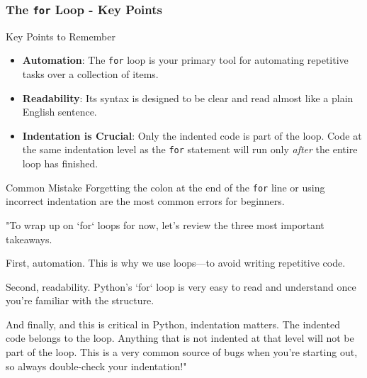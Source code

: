 \documentclass{beamer}
\begin{document}
\begin{frame}[fragile]
    \frametitle{The \texttt{for} Loop - Key Points}
    
    \begin{block}{Key Points to Remember}
        \begin{itemize}
            \item \textbf{Automation}: The \texttt{for} loop is your primary tool for automating repetitive tasks over a collection of items.
            \vspace{1em}
            \item \textbf{Readability}: Its syntax is designed to be clear and read almost like a plain English sentence.
            \vspace{1em}
            \item \textbf{Indentation is Crucial}: Only the indented code is part of the loop. Code at the same indentation level as the \texttt{for} statement will run only \textit{after} the entire loop has finished.
        \end{itemize}
    \end{block}

    \begin{alertblock}{Common Mistake}
        Forgetting the colon at the end of the \texttt{for} line or using incorrect indentation are the most common errors for beginners.
    \end{alertblock}
    
    \begin{note}
    "To wrap up on `for` loops for now, let's review the three most important takeaways.
    
    First, automation. This is why we use loops—to avoid writing repetitive code.
    
    Second, readability. Python's `for` loop is very easy to read and understand once you're familiar with the structure.
    
    And finally, and this is critical in Python, indentation matters. The indented code belongs to the loop. Anything that is not indented at that level will not be part of the loop. This is a very common source of bugs when you're starting out, so always double-check your indentation!"
    \end{note}
\end{frame}
\end{document}
